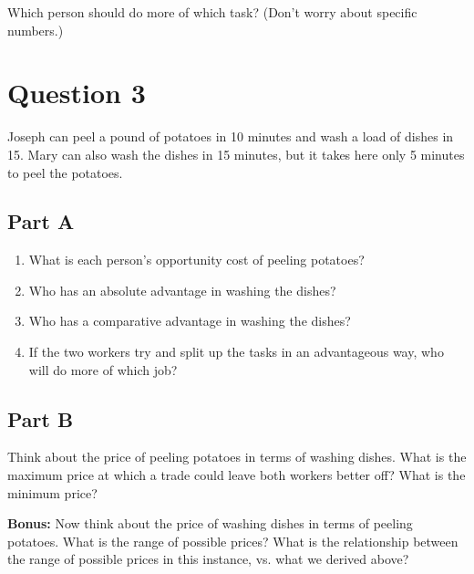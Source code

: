 \documentclass[12pt]{article}
\begin{document}
\medskip

Which person should do more of which task? (Don't worry about specific numbers.)

\section*{Question 3}
Joseph can peel a pound of potatoes in 10 minutes and wash a load of dishes in 15. Mary can also wash the dishes in 15 minutes, but it takes here only 5 minutes to peel the potatoes. 
    
\subsection*{Part A}
    \begin{enumerate}
        \item What is each person's opportunity cost of peeling potatoes?
        \item Who has an absolute advantage in washing the dishes?
        \item Who has a comparative advantage in washing the dishes?
        \item If the two workers try and split up the tasks in an advantageous way, who will do more of which job?
    \end{enumerate}

\subsection*{Part B}
Think about the price of peeling potatoes in terms of washing dishes. What is the maximum price at which a trade could leave both workers better off? What is the minimum price?

\medskip

\textbf{Bonus:} Now think about the price of washing dishes in terms of peeling potatoes. What is the range of possible prices? What is the relationship between the range of possible prices in this instance, vs. what we derived above?
\end{document}

